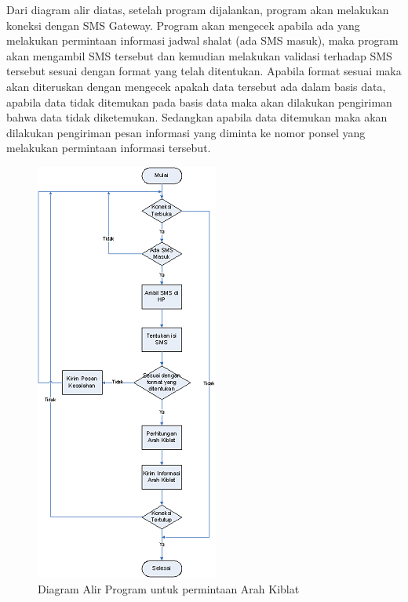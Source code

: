 \documentclass{jtetiproposalskripsi}
\begin{document}
Dari diagram alir diatas, setelah program dijalankan, program akan melakukan koneksi dengan SMS Gateway. Program akan mengecek apabila ada yang melakukan permintaan informasi jadwal shalat (ada SMS masuk), maka program akan mengambil SMS tersebut dan kemudian melakukan validasi terhadap SMS tersebut sesuai dengan format yang telah ditentukan. Apabila format sesuai maka akan diteruskan dengan mengecek apakah data tersebut ada dalam basis data, apabila data tidak ditemukan pada basis data maka akan dilakukan pengiriman bahwa data tidak diketemukan. Sedangkan apabila data ditemukan maka akan dilakukan pengiriman pesan informasi yang diminta ke nomor ponsel yang melakukan permintaan informasi tersebut.

\begin{figure}[ht!]
  \centering
    \includegraphics{gambar/gambar4}
    \caption{Diagram Alir Program untuk permintaan Arah Kiblat}
    \label{kripto}
\end{figure}




\end{document}
